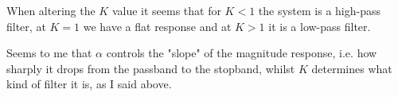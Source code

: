 \documentclass[a4paper,11pt,norsk]{article}
\begin{document}
\begin{enumerate}
        When altering the $K$ value it seems that for $K < 1$ the system is a high-pass filter, at $K=1$ we have a flat 
        response and at $K > 1$ it is a low-pass filter.

        Seems to me that $\alpha$ controls the "slope" of the magnitude response, i.e. how sharply it drops from the passband to the stopband, whilst $K$ determines what kind of filter 
        it is, as I said above.

\end{enumerate}
\end{document}
